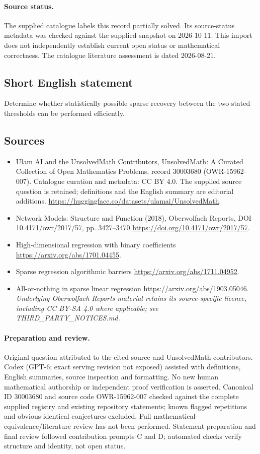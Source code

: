 \documentclass[11pt]{article}
\begin{document}
\paragraph{Source status.}
The supplied catalogue labels this record partially solved. Its source-status metadata was checked against the supplied snapshot on 2026-10-11. This import does not independently establish current open status or mathematical correctness. The catalogue literature assessment is dated 2026-08-21.
\subsection{Short English statement}
Determine whether statistically possible sparse recovery between the two stated thresholds can be performed efficiently.
\subsection{Sources}
\begin{itemize}
\item[\hypertarget{source:30003680:1}{S1}] Ulam AI and the UnsolvedMath Contributors, UnsolvedMath: A Curated Collection of Open Mathematics Problems, record 30003680 (OWR-15962-007). Catalogue curation and metadata: CC BY 4.0. The supplied source question is retained; definitions and the English summary are editorial additions.
\url{https://huggingface.co/datasets/ulamai/UnsolvedMath}.
\item[\hypertarget{source:30003680:2}{S2}] Network Models: Structure and Function (2018), Oberwolfach Reports, DOI 10.4171/owr/2017/57, pp. 3427--3470
\url{https://doi.org/10.4171/owr/2017/57}.
\item[\hypertarget{source:30003680:3}{S3}] High-dimensional regression with binary coefficients
\url{https://arxiv.org/abs/1701.04455}.
\item[\hypertarget{source:30003680:4}{S4}] Sparse regression algorithmic barriers
\url{https://arxiv.org/abs/1711.04952}.
\item[\hypertarget{source:30003680:5}{S5}] All-or-nothing in sparse linear regression
\url{https://arxiv.org/abs/1903.05046}.
\textit{Underlying Oberwolfach Reports material retains its source-specific licence, including CC BY-SA 4.0 where applicable; see THIRD\_PARTY\_NOTICES.md.}
\end{itemize}
\paragraph{Preparation and review.}
Original question attributed to the cited source and UnsolvedMath contributors. Codex (GPT-6; exact serving revision not exposed) assisted with definitions, English summaries, source inspection and formatting. No new human mathematical authorship or independent proof verification is asserted. Canonical ID 30003680 and source code OWR-15962-007 checked against the complete supplied registry and existing repository statements; known flagged repetitions and obvious identical conjectures excluded. Full mathematical-equivalence/literature review has not been performed. Statement preparation and final review followed contribution prompts C and D; automated checks verify structure and identity, not open status.
\label{end:30003680}
\end{document}
